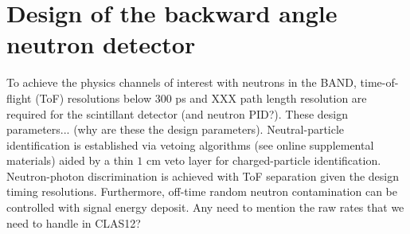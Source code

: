 \documentclass[review]{elsarticle}
\begin{document}
\section{Design of the backward angle neutron detector}
To achieve the physics channels of interest with neutrons in the BAND, time-of-flight (ToF) resolutions below $300$ \si{\pico\second} and XXX path length 
resolution are required for the scintillant detector {\color{red}(and neutron PID?)}. {\color{red}These design parameters... (why are these the 
design parameters)}. Neutral-particle identification is established via vetoing algorithms ({\color{red}see online supplemental materials}) aided by
a thin $1$ \si{\centi\meter} veto layer for charged-particle identification. Neutron-photon discrimination is achieved with ToF separation given the design 
timing resolutions. Furthermore, off-time random neutron contamination can be controlled with signal energy deposit. {\color{red} Any need to mention 
the raw rates that we need to handle in CLAS12?} 
\end{document}
